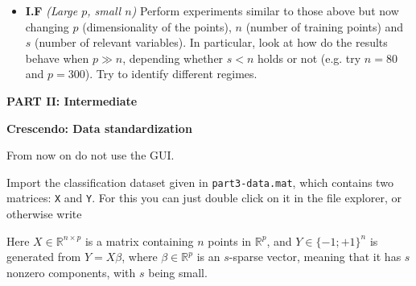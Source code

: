 \documentclass[DIN, pagenumber=false, fontsize=11pt, parskip=half]{scrartcl}
\newcommand{\mysection}[1]{\noindent\large\textbf{#1}}
\begin{document}
\begin{itemize}
	\item \textbf{I.F} \emph{(Large $p$, small $n$)} Perform experiments similar to those above but now changing $p$ (dimensionality of the points), $n$ (number of training points) and $s$ (number of relevant variables).
	In particular, look at how do the results behave when $p\gg n$, depending whether $s<n$ holds or not (e.g. try $n=80$ and $p=300$).
  Try to identify different regimes.


\end{itemize}














\begin{center}
\large\textbf{PART II: Intermediate}
\end{center}

\mysection{Crescendo: Data standardization}

From now on do not use the GUI.

Import the classification dataset given in \texttt{part3-data.mat}, which contains two matrices: \texttt{X} and \texttt{Y}.
For this you can just double click on it in the file explorer, or otherwise write\\

Here $X \in \mathbb{R}^{n \times p}$ is a matrix containing $n$ points in $\mathbb{R}^p$, and $Y \in \{-1;+1\}^n$ is generated from $Y=X \beta$, where $\beta \in \mathbb{R}^p$ is an $s$-sparse vector, meaning that it has $s$ nonzero components, with $s$ being small.
\end{document}
